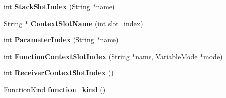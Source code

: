 \begin{DoxyCompactItemize}
\item 
int {\bfseries Stack\+Slot\+Index} (\hyperlink{classv8_1_1internal_1_1_string}{String} $\ast$name)\hypertarget{classv8_1_1internal_1_1_scope_info_a9d747b94a71c42e5eac3a2420c4686c9}{}\label{classv8_1_1internal_1_1_scope_info_a9d747b94a71c42e5eac3a2420c4686c9}

\item 
\hyperlink{classv8_1_1internal_1_1_string}{String} $\ast$ {\bfseries Context\+Slot\+Name} (int slot\+\_\+index)\hypertarget{classv8_1_1internal_1_1_scope_info_a7df64ea6fc9c6e858b95f053e58c94f2}{}\label{classv8_1_1internal_1_1_scope_info_a7df64ea6fc9c6e858b95f053e58c94f2}

\item 
int {\bfseries Parameter\+Index} (\hyperlink{classv8_1_1internal_1_1_string}{String} $\ast$name)\hypertarget{classv8_1_1internal_1_1_scope_info_a00f9938ad8b3975ffa57dbde5bccd7f3}{}\label{classv8_1_1internal_1_1_scope_info_a00f9938ad8b3975ffa57dbde5bccd7f3}

\item 
int {\bfseries Function\+Context\+Slot\+Index} (\hyperlink{classv8_1_1internal_1_1_string}{String} $\ast$name, Variable\+Mode $\ast$mode)\hypertarget{classv8_1_1internal_1_1_scope_info_a6f12ab64462159f6fd4226cdd14d2279}{}\label{classv8_1_1internal_1_1_scope_info_a6f12ab64462159f6fd4226cdd14d2279}

\item 
int {\bfseries Receiver\+Context\+Slot\+Index} ()\hypertarget{classv8_1_1internal_1_1_scope_info_a429af63231cf2cf9052488d1c5aae26e}{}\label{classv8_1_1internal_1_1_scope_info_a429af63231cf2cf9052488d1c5aae26e}

\item 
Function\+Kind {\bfseries function\+\_\+kind} ()\hypertarget{classv8_1_1internal_1_1_scope_info_ae463a65a2d3e7d13b785d2339e1cffb8}{}\label{classv8_1_1internal_1_1_scope_info_ae463a65a2d3e7d13b785d2339e1cffb8}

\end{DoxyCompactItemize}
